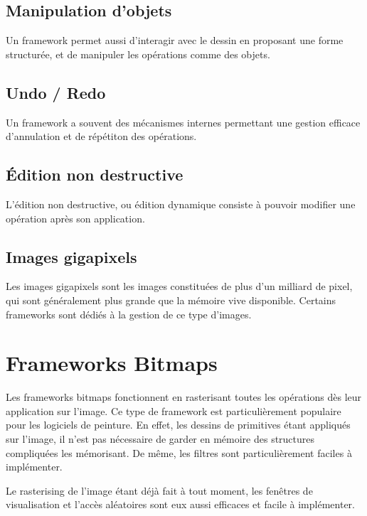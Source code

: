 		\subsection{Manipulation d'objets}
			Un framework permet aussi d'interagir avec le dessin en proposant une forme structurée, et de manipuler les opérations
			comme des objets.  
		\subsection{Undo / Redo}
			Un framework a souvent des mécanismes internes permettant une gestion efficace d'annulation et de répétiton des opérations.
		\subsection{Édition non destructive}
			L'édition non destructive, ou édition dynamique consiste à pouvoir modifier une opération après son application.   
		\subsection{Images gigapixels}
			Les images gigapixels sont les images constituées de plus d'un milliard de pixel, qui sont généralement plus grande que la mémoire
			vive disponible. Certains frameworks sont dédiés à la gestion de ce type d'images. 
	\section{Frameworks Bitmaps}
		Les frameworks bitmaps fonctionnent en rasterisant toutes les opérations dès leur application sur l'image. 
		Ce type de framework est particulièrement populaire pour les logiciels de peinture. En effet, les dessins
		de primitives étant appliqués sur l'image, il n'est pas nécessaire de garder en mémoire des structures compliquées
		les mémorisant. De même, les filtres sont particulièrement faciles à implémenter.

		Le rasterising de l'image étant déjà fait à tout moment, les fenêtres de visualisation et l'accès aléatoires sont
		eux aussi efficaces et facile à implémenter. 


